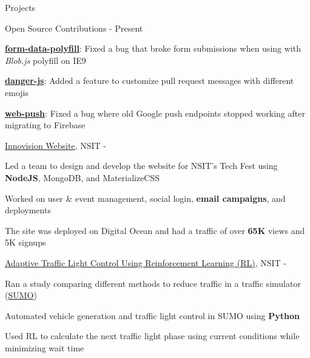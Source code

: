 \documentclass[UKenglish]{resume} %
\begin{document}
\begin{rSection}{Projects}

    \begin{rSubsection}
        {Open Source Contributions}
        {  - Present }
        {}{}

        \item \href{https://github.com/jimmywarting/FormData/pull/87}{\textbf{form-data-polyfill}}: Fixed a bug that broke form submissions when using with {\em Blob.js} polyfill on IE9
        \item \href{https://github.com/danger/danger-js/pull/892}{\textbf{danger-js}}: Added a feature to customize pull request messages with different emojis \faHeart
        \item \href{https://github.com/web-push-libs/web-push/pull/456}{\textbf{web-push}}: Fixed a bug where old Google push endpoints stopped working after migrating to Firebase
    \end{rSubsection}

    \begin{rSubsection}
        {\href{https://github.com/rohit-smpx/inno}{Innovision Website}, {\nem NSIT}}
        {  -  }
        {}{}
        \item Led a team to design and develop the website for NSIT’s Tech Fest using \textbf{NodeJS}, MongoDB, and MaterializeCSS
        \item Worked on user \& event management, social login, \textbf{email campaigns}, and deployments
        \item The site was deployed on Digital Ocean and had a traffic of over \textbf{65K} views and 5K signups
    \end{rSubsection}

    \begin{rSubsection}
        {\href{https://github.com/rohit-smpx/trafficRL}{Adaptive Traffic Light Control Using Reinforcement Learning (RL)}, {\nem NSIT}}
        {  -  }
        {}{}

        \item Ran a study comparing different methods to reduce traffic in a traffic simulator (\href{https://sumo.dlr.de}{SUMO})
        \item Automated vehicle generation and traffic light control in SUMO using \textbf{Python}
        \item Used RL to calculate the next traffic light phase using current conditions while minimizing wait time
    \end{rSubsection}


\end{rSection}
\end{document}
